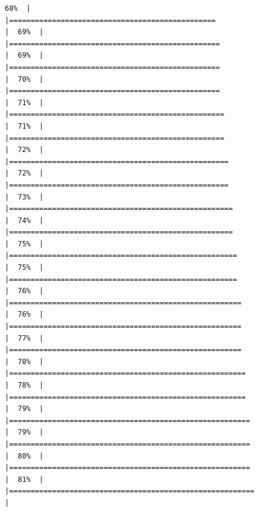 \documentclass[
  english,
  man,a4paper,mask,floatsintext]{apa6}
\begin{document}
\begin{verbatim}
68%  |                                                                              |================================================                      |  69%  |                                                                              |=================================================                     |  69%  |                                                                              |=================================================                     |  70%  |                                                                              |=================================================                     |  71%  |                                                                              |==================================================                    |  71%  |                                                                              |==================================================                    |  72%  |                                                                              |===================================================                   |  72%  |                                                                              |===================================================                   |  73%  |                                                                              |====================================================                  |  74%  |                                                                              |====================================================                  |  75%  |                                                                              |=====================================================                 |  75%  |                                                                              |=====================================================                 |  76%  |                                                                              |======================================================                |  76%  |                                                                              |======================================================                |  77%  |                                                                              |======================================================                |  78%  |                                                                              |=======================================================               |  78%  |                                                                              |=======================================================               |  79%  |                                                                              |========================================================              |  79%  |                                                                              |========================================================              |  80%  |                                                                              |========================================================              |  81%  |                                                                              |=========================================================             |  
\end{verbatim}
\end{document}
